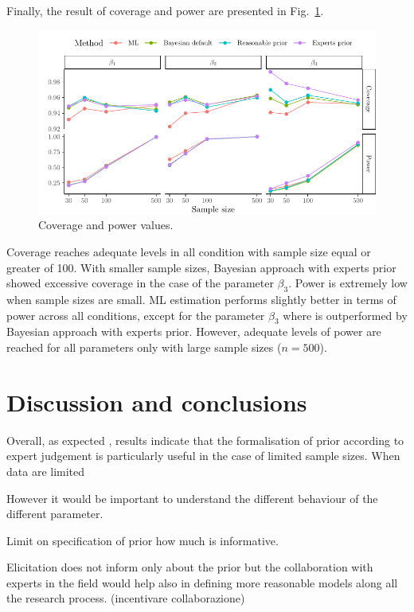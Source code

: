 \documentclass[graybox]{svmult}
\begin{document}
Finally, the result of coverage and power are presented in Fig.~\ref{fig:Plot_coverage_power}.
\begin{figure}[b]
	\sidecaption
	\includegraphics[width = .9\textwidth]{figure/Plot_coverage_power}
	\caption{Coverage and power values.}
	\label{fig:Plot_coverage_power}
\end{figure}
Coverage reaches adequate levels in all condition  with sample size  equal or greater of 100. With smaller sample sizes, Bayesian approach with experts prior showed excessive coverage in the case of the parameter $\beta_3$. Power is extremely low when sample sizes are small. ML estimation performs slightly better in terms of power across all conditions, except for the  parameter $\beta_3$ where is outperformed by Bayesian approach with experts prior. However, adequate levels of power are reached for all parameters only with large sample sizes ($n = 500$).

\section{Discussion and conclusions}

\label{sec:dicussion}

Overall, as expected , results indicate that the formalisation of prior according to expert judgement is particularly useful in the case of limited sample sizes. When data are limited 

However it would be important to understand the different behaviour of the different parameter.

Limit on specification of prior how much is informative.

Elicitation does not inform only about the prior but the collaboration with experts in the field would help also in defining more reasonable models along all the research process. (incentivare collaborazione)
\end{document}
